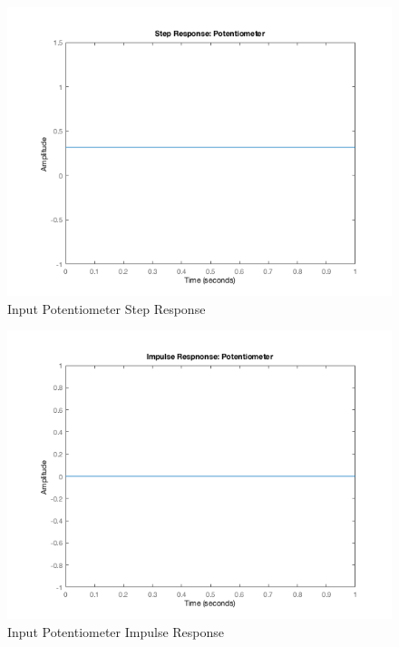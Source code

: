 \documentclass[12pt]{article}
\begin{document}
\begin{figure}[H]
\begin{center}
	\includegraphics[width=\textwidth]{./img/PotentiometerStep.png}
	\caption{\label{fig:potstep}Input Potentiometer Step Response}
\end{center}
\end{figure}

\begin{figure}[H]
\begin{center}
	\includegraphics[width=\textwidth]{./img/PotentiometerImpulse.png}
	\caption{\label{fig:potimpulse}Input Potentiometer Impulse Response}
\end{center}
\end{figure}
\end{document}
